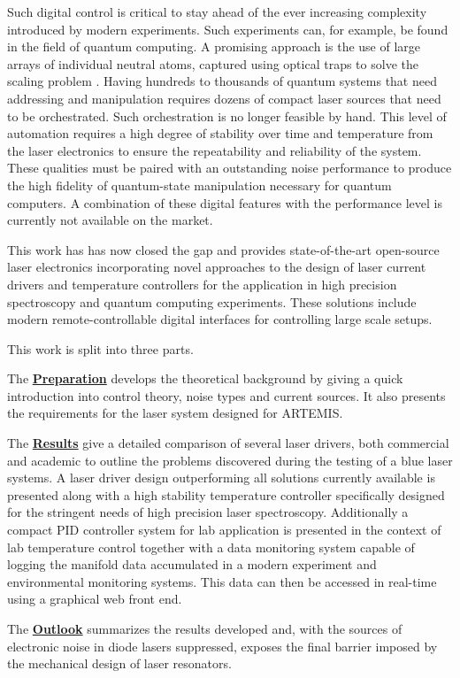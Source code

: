 Such digital control is critical to stay ahead of the ever increasing complexity introduced by modern experiments. Such experiments can, for example, be found in the field of quantum computing. A promising approach is the use of large arrays of individual neutral atoms, captured using optical traps to solve the scaling problem \cite{quatum_computer_scaling_ions}. Having hundreds to thousands of quantum systems that need addressing and manipulation requires dozens of compact laser sources that need to be orchestrated. Such orchestration is no longer feasible by hand. This level of automation requires a high degree of stability over time and temperature from the laser electronics to ensure the repeatability and reliability of the system. These qualities must be paired with an outstanding noise performance to produce the high fidelity of quantum-state manipulation necessary for quantum computers. A combination of these digital features with the performance level is currently not available on the market.

This work has has now closed the gap and provides state-of-the-art open-source laser electronics incorporating novel approaches to the design of laser current drivers and temperature controllers for the application in high precision spectroscopy and quantum computing experiments. These solutions include modern remote-controllable digital interfaces for controlling large scale setups.

This work is split into three parts. \par\vspace{12pt}

The \hyperref[sec:preparation]{\textbf{Preparation}} develops the theoretical background by giving a quick introduction into control theory, noise types and current sources. It also presents the requirements for the laser system designed for ARTEMIS.\par\vspace{12pt}

The \hyperref[sec:results]{\textbf{Results}} give a detailed comparison of several laser drivers, both commercial and academic to outline the problems discovered during the testing of a blue laser systems. A laser driver design outperforming all solutions currently available is presented along with a high stability temperature controller specifically designed for the stringent needs of high precision laser spectroscopy. Additionally a compact PID controller system for lab application is presented in the context of lab temperature control together with a data monitoring system capable of logging the manifold data accumulated in a modern experiment and environmental monitoring systems. This data can then be accessed in real-time using a graphical web front end. \par\vspace{12pt}

The \hyperref[sec:outlook]{\textbf{Outlook}} summarizes the results developed and, with the sources of electronic noise in diode lasers suppressed, exposes the final barrier imposed by the mechanical design of laser resonators.
